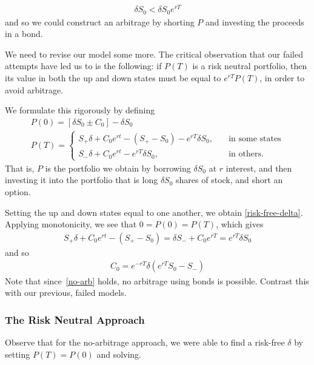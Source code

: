 \documentclass[12pt]{article}
\theoremstyle{plain}
\theoremstyle{definition}
\theoremstyle{remark}
\numberwithin{equation}{section}  %
\begin{document}
\begin{equation*}
\begin{split}
	\delta S_{0} < \delta S_{0} e^{rT}
\end{split}
\end{equation*}
and so we could construct an arbitrage by shorting $P$ and investing
the proceeds in a bond.

We need to revise our model some more. The critical observation that our failed
attempts have led us to is the following: if $P(T)$
is a risk neutral portfolio, then its value in both the up and down
states must be equal to $e^{rT}P(T)$, in order to avoid arbitrage. 

We formulate this rigorously by defining
\begin{gather*}
	P(0) = [\delta S_{0} \pm C_{0}] - \delta S_{0}
	\\
		P(T)  = \begin{cases}
			S_{+} \delta + C_{0}e^{rt} - (S_{+} - S_{0}) - e^{rT} \delta S_{0}, \quad & \text{in some states}
			\\
			S_{-} \delta + C_{0}e^{rt} - e^{rT} \delta S_{0}, \quad & \text{in others}.
		\end{cases}
\end{gather*}
That is, $P$ is the portfolio we obtain by borrowing $\delta S_{0}$
at $r$ interest, and then investing it into the portfolio that is long
$\delta S_{0}$ shares of stock, and short an option.

Setting the up and down states equal to one another, we obtain
\eqref{risk-free-delta}. Applying monotonicity, we see that
$0 = P(0) = P(T)$, which gives
\begin{equation}\label{no-arb}
\begin{split}
S_{+} \delta + C_{0}e^{rt} - (S_{+} - S_{0})
 = 	\delta S_{-} + C_{0} e^{rT} = e^{rT} \delta S_{0} 
\end{split}
\end{equation}
and so
\begin{equation}
\begin{split}
	C_{0} = e^{-rT}\delta(e^{rT} S_{0} - S_{-})
\end{split}
\end{equation}
Note that since~\eqref{no-arb} holds, no arbitrage using bonds is
possible. Contrast this with our previous, failed models. 
\subsubsection{The Risk Neutral Approach}
Observe that for the no-arbitrage approach, we were able to find a risk-free
$\delta$ by setting $P(T) = P(0)$ and solving.
\end{document}
